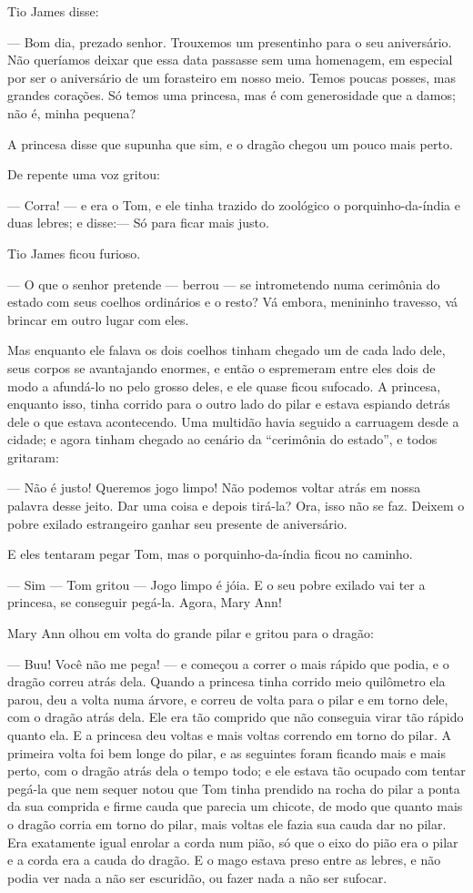 Tio James disse:

— Bom dia, prezado senhor. Trouxemos um presentinho para o seu
aniversário. Não queríamos deixar que essa data passasse sem uma
homenagem, em especial por ser o aniversário de um forasteiro em
nosso meio. Temos poucas posses, mas grandes corações. Só temos uma
princesa, mas é com generosidade que a damos; não é, minha pequena?

A princesa disse que supunha que sim, e o dragão chegou um pouco mais
perto. 

De repente uma voz gritou:

— Corra! — e era o Tom, e ele tinha trazido do zoológico o
porquinho-da-índia e duas lebres; e disse:— Só para ficar mais justo.


Tio James ficou furioso.

— O que o senhor pretende — berrou — se intrometendo numa cerimônia do
estado com seus coelhos ordinários e o resto? Vá embora, menininho
travesso, vá brincar em outro lugar com eles.

Mas enquanto ele falava os dois coelhos tinham chegado um de cada lado
dele, seus corpos se avantajando enormes, e então o espremeram entre
eles dois de modo a afundá-lo no pelo grosso deles, e ele quase ficou
sufocado. A princesa, enquanto isso, tinha corrido para o outro lado
do pilar e estava espiando detrás dele o que estava acontecendo. Uma
multidão havia seguido a carruagem desde a cidade; e agora tinham
chegado ao cenário da “cerimônia do estado”, e todos gritaram:

— Não é justo! Queremos jogo limpo! Não podemos voltar atrás em nossa
palavra desse jeito. Dar uma coisa e depois tirá-la? Ora, isso não se
faz. Deixem o pobre exilado estrangeiro ganhar seu presente de
aniversário.

E eles tentaram pegar Tom, mas o porquinho-da-índia ficou no caminho.

— Sim — Tom gritou — Jogo limpo é jóia. E o seu pobre exilado vai ter
a princesa, se conseguir pegá-la. Agora, Mary Ann!

Mary Ann olhou em volta do grande pilar e gritou para o dragão:

— Buu! Você não me pega! — e começou a correr o mais rápido que podia,
e o dragão correu atrás dela. Quando a princesa tinha corrido meio
quilômetro ela parou, deu a volta numa árvore, e correu de volta para
o pilar e em torno dele, com o dragão atrás dela. Ele era tão
comprido que não conseguia virar tão rápido quanto ela. E a princesa
deu voltas e mais voltas correndo em torno do pilar. A primeira volta
foi bem longe do pilar, e as seguintes foram ficando mais e mais
perto, com o dragão atrás dela o tempo todo; e ele estava tão ocupado
com tentar pegá-la que nem sequer notou que Tom tinha prendido na
rocha do pilar a ponta da sua comprida e firme cauda que parecia um
chicote, de modo que quanto mais o dragão corria em torno do pilar,
mais voltas ele fazia sua cauda dar no pilar. Era exatamente igual
enrolar a corda num pião, só que o eixo do pião era o pilar e a corda
era a cauda do dragão. E o mago estava preso entre as lebres, e não
podia ver nada a não ser escuridão, ou fazer nada a não ser sufocar.

